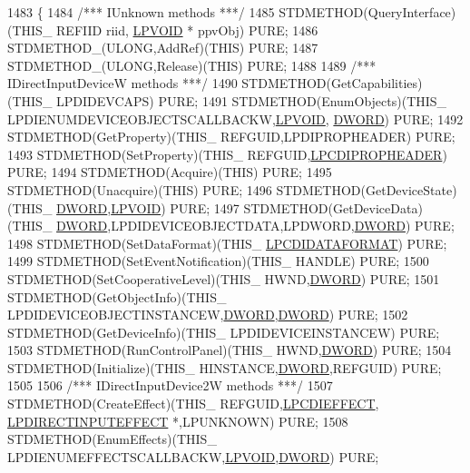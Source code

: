 \begin{DoxyCode}
1483 \{
1484     \textcolor{comment}{/*** IUnknown methods ***/}
1485     STDMETHOD(QueryInterface)(THIS\_ REFIID riid, \hyperlink{a00003_ae611cd6871649dbfe37273a0253d5e61}{LPVOID} * ppvObj) PURE;
1486     STDMETHOD\_(ULONG,AddRef)(THIS) PURE;
1487     STDMETHOD\_(ULONG,Release)(THIS) PURE;
1488 
1489     \textcolor{comment}{/*** IDirectInputDeviceW methods ***/}
1490     STDMETHOD(GetCapabilities)(THIS\_ LPDIDEVCAPS) PURE;
1491     STDMETHOD(EnumObjects)(THIS\_ LPDIENUMDEVICEOBJECTSCALLBACKW,\hyperlink{a00003_ae611cd6871649dbfe37273a0253d5e61}{LPVOID},
      \hyperlink{a00003_a50e15ae51c87ae06ab29c8148cb5f36c}{DWORD}) PURE;
1492     STDMETHOD(GetProperty)(THIS\_ REFGUID,LPDIPROPHEADER) PURE;
1493     STDMETHOD(SetProperty)(THIS\_ REFGUID,\hyperlink{a00003_aa73246465a32c316894f99e088564911}{LPCDIPROPHEADER}) PURE;
1494     STDMETHOD(Acquire)(THIS) PURE;
1495     STDMETHOD(Unacquire)(THIS) PURE;
1496     STDMETHOD(GetDeviceState)(THIS\_ \hyperlink{a00003_a50e15ae51c87ae06ab29c8148cb5f36c}{DWORD},\hyperlink{a00003_ae611cd6871649dbfe37273a0253d5e61}{LPVOID}) PURE;
1497     STDMETHOD(GetDeviceData)(THIS\_ \hyperlink{a00003_a50e15ae51c87ae06ab29c8148cb5f36c}{DWORD},LPDIDEVICEOBJECTDATA,LPDWORD,\hyperlink{a00003_a50e15ae51c87ae06ab29c8148cb5f36c}{DWORD}) PURE;
1498     STDMETHOD(SetDataFormat)(THIS\_ \hyperlink{a00003_ab7e0c3254f09795a4a2176cac228ba7d}{LPCDIDATAFORMAT}) PURE;
1499     STDMETHOD(SetEventNotification)(THIS\_ HANDLE) PURE;
1500     STDMETHOD(SetCooperativeLevel)(THIS\_ HWND,\hyperlink{a00003_a50e15ae51c87ae06ab29c8148cb5f36c}{DWORD}) PURE;
1501     STDMETHOD(GetObjectInfo)(THIS\_ LPDIDEVICEOBJECTINSTANCEW,\hyperlink{a00003_a50e15ae51c87ae06ab29c8148cb5f36c}{DWORD},\hyperlink{a00003_a50e15ae51c87ae06ab29c8148cb5f36c}{DWORD}) PURE;
1502     STDMETHOD(GetDeviceInfo)(THIS\_ LPDIDEVICEINSTANCEW) PURE;
1503     STDMETHOD(RunControlPanel)(THIS\_ HWND,\hyperlink{a00003_a50e15ae51c87ae06ab29c8148cb5f36c}{DWORD}) PURE;
1504     STDMETHOD(Initialize)(THIS\_ HINSTANCE,\hyperlink{a00003_a50e15ae51c87ae06ab29c8148cb5f36c}{DWORD},REFGUID) PURE;
1505 
1506     \textcolor{comment}{/*** IDirectInputDevice2W methods ***/}
1507     STDMETHOD(CreateEffect)(THIS\_ REFGUID,\hyperlink{a00003_a7913240b16286bfdcb811a35a982b236}{LPCDIEFFECT},
      \hyperlink{a00003_ac8278f319038d7db709c5ea828830fb9}{LPDIRECTINPUTEFFECT} *,LPUNKNOWN) PURE;
1508     STDMETHOD(EnumEffects)(THIS\_ LPDIENUMEFFECTSCALLBACKW,\hyperlink{a00003_ae611cd6871649dbfe37273a0253d5e61}{LPVOID},\hyperlink{a00003_a50e15ae51c87ae06ab29c8148cb5f36c}{DWORD}) PURE;

\end{DoxyCode}
